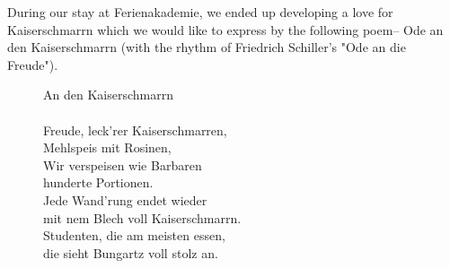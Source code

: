During our stay at Ferienakademie, we ended up developing a love for Kaiserschmarrn which we would like to express by the following poem-- Ode an den Kaiserschmarrn (with the rhythm of Friedrich Schiller's "Ode an die Freude"). 
\begin{figure}[ht]
\begin{framed}
An den Kaiserschmarrn 
\\
\\
Freude, leck'rer Kaiserschmarren,\\
Mehlspeis mit Rosinen,\\
Wir verspeisen wie Barbaren \\
hunderte Portionen.\\

Jede Wand'rung endet wieder \\
mit nem Blech voll Kaiserschmarrn.\\
Studenten, die am meisten essen,\\
die sieht Bungartz voll stolz an.
\end{framed}
\end{figure}
\vfill
